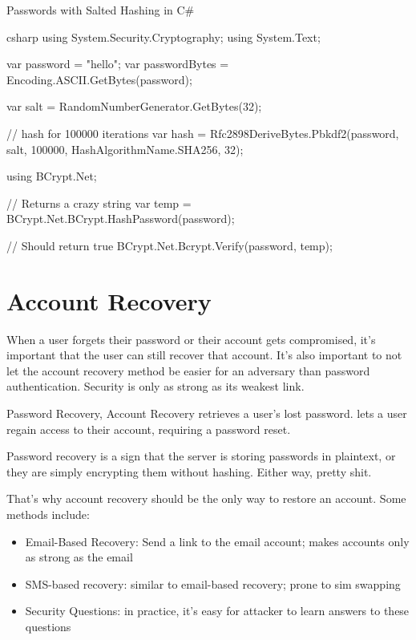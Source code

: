 \documentclass[code]{amznotes}
\begin{document}
\begin{codebox}{Passwords with Salted Hashing in C\#}{}{}
    \begin{amzcode}{csharp}
using System.Security.Cryptography;
using System.Text;

var password = "hello";
var passwordBytes = Encoding.ASCII.GetBytes(password);

var salt = RandomNumberGenerator.GetBytes(32);

// hash for 100000 iterations
var hash = Rfc2898DeriveBytes.Pbkdf2(password, salt, 100000, HashAlgorithmName.SHA256, 32);

using BCrypt.Net;

// Returns a crazy string
var temp = BCrypt.Net.BCrypt.HashPassword(password);

// Should return true
BCrypt.Net.Bcrypt.Verify(password, temp);
    \end{amzcode}
\end{codebox}

\section{Account Recovery}

When a user forgets their password or their account gets compromised, it's important that the user can still recover that account. It's also important to not let the account recovery method be easier for an adversary than password authentication. Security is only as strong as its weakest link.

\begin{dfnbox}{Password Recovery, Account Recovery}{}
     retrieves a user's lost password.  lets a user regain access to their account, requiring a password reset.
\end{dfnbox}

Password recovery is a sign that the server is storing passwords in plaintext, or they are simply encrypting them without hashing. Either way, pretty shit.

That's why account recovery should be the only way to restore an account. Some methods include:
\begin{itemize}[noitemsep]
    \item Email-Based Recovery: Send a link to the email account; makes accounts only as strong as the email
    \item SMS-based recovery: similar to email-based recovery; prone to sim swapping
    \item Security Questions: in practice, it's easy for attacker to learn answers to these questions
\end{itemize}
\end{document}
